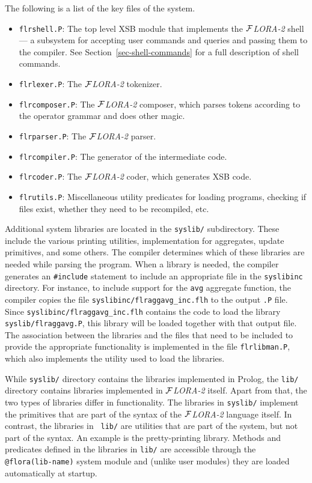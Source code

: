\documentclass[11pt]{article}
\newcommand{\FLORA}{{\mbox{${\cal F}${\small\it LORA}\rm\emph{-2}}}\xspace}
\begin{document}
The following is a list of the key files of the system.
\begin{itemize}
\item \texttt{flrshell.P}: The top level XSB module that implements the
  \FLORA shell --- a subsystem for accepting user commands and queries and
  passing them to the compiler.  See Section~\ref{sec-shell-commands} for a
  full description of shell commands.
\item \texttt{flrlexer.P}: The \FLORA tokenizer.
\item \texttt{flrcomposer.P}: The \FLORA composer, which parses tokens
  according to the operator grammar and does other magic.
\item \texttt{flrparser.P}: The \FLORA parser.
\item \texttt{flrcompiler.P}: The generator of the intermediate code.
\item \texttt{flrcoder.P}: The \FLORA coder, which generates XSB code.
\item \texttt{flrutils.P}: Miscellaneous utility predicates for loading
  programs, checking if files exist, whether they need to be recompiled,
  etc.
\end{itemize}
Additional system libraries are located in the {\tt syslib/} subdirectory.
These include the various printing utilities, implementation for
aggregates, update primitives, and some others. The compiler determines
which of these libraries are needed while parsing the program. When a
library is needed, the compiler generates an {\tt \#include} statement to
include an appropriate file in the {\tt syslibinc} directory. For instance,
to include support for the {\tt avg} aggregate function, the compiler
copies the file {\tt syslibinc/flraggavg\_inc.flh} to the output {\tt .P}
file.  Since {\tt syslibinc/flraggavg\_inc.flh} contains the code to load
the library {\tt syslib/flraggavg.P}, this library will be loaded together
with that output file. The association between the libraries and the files
that need to be included to provide the appropriate functionality is
implemented in the file {\tt flrlibman.P}, which also implements the
utility used to load the libraries.

While {\tt syslib/} directory contains the libraries implemented in Prolog,
the {\tt lib/} directory contains libraries implemented in \FLORA itself.
Apart from that, the two types of libraries differ in functionality.  The
libraries in {\tt syslib/} implement the primitives that are part of the
syntax of the \FLORA language itself. In contrast, the libraries in {\tt
  lib/} are utilities that are part of the system, but not part of the
syntax. An example is the pretty-printing library.  Methods and predicates
defined in the libraries in {\tt lib/} are accessible through the {\tt
  @flora(lib-name)} system module and (unlike user modules) they are loaded
automatically at startup.
\end{document}

